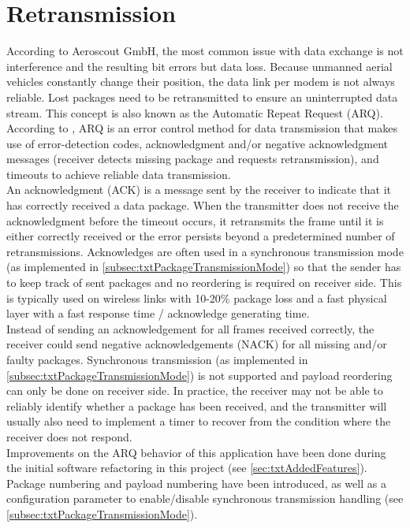 \section{Retransmission} \label{sec:txtRetransmission}
%
According to Aeroscout GmbH, the most common issue with data exchange is not interference and the resulting bit errors but data loss. Because unmanned aerial vehicles constantly change their position, the data link per modem is not always reliable. Lost packages need to be retransmitted to ensure an uninterrupted data stream. This concept is also known as the Automatic Repeat Request (ARQ). According to \cite{ErrorDetectionAndCorrection_Wikipedia}, ARQ is an error control method for data transmission that makes use of error-detection codes, acknowledgment and/or negative acknowledgment messages (receiver detects missing package and requests retransmission), and timeouts to achieve reliable data transmission.\\
An acknowledgment (ACK) is a message sent by the receiver to indicate that it has correctly received a data package. When the transmitter does not receive the acknowledgment before the timeout occurs, it retransmits the frame until it is either correctly received or the error persists beyond a predetermined number of retransmissions. Acknowledges are often used in a synchronous transmission mode (as implemented in \autoref{subsec:txtPackageTransmissionMode}) so that the sender has to keep track of sent packages and no reordering is required on receiver side. This is typically used on wireless links with 10-20\% package loss and a fast physical layer with a fast response time / acknowledge generating time.\\
Instead of sending an acknowledgement for all frames received correctly, the receiver could send negative acknowledgements (NACK) for all missing and/or faulty packages. Synchronous transmission (as implemented in \autoref{subsec:txtPackageTransmissionMode}) is not supported and payload reordering can only be done on receiver side.  In practice, the receiver may not be able to reliably identify whether a package has been received, and the transmitter will usually also need to implement a timer to recover from the condition where the receiver does not respond.\\
Improvements on the ARQ behavior of this application have been done during the initial software refactoring in this project (see \autoref{sec:txtAddedFeatures}). Package numbering and payload numbering have been introduced, as well as a configuration parameter to enable/disable synchronous transmission handling (see \autoref{subsec:txtPackageTransmissionMode}).\\
